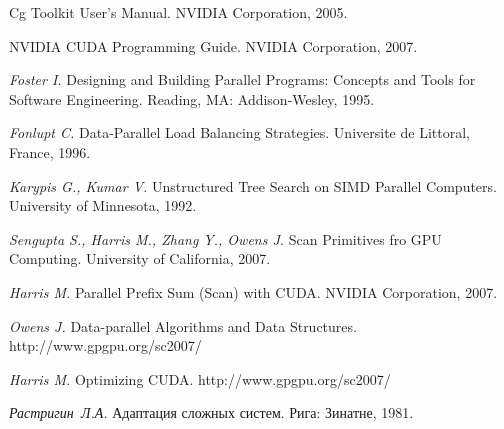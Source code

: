 \begin{thebibliography}{99}
    Cg Toolkit User's Manual.
    NVIDIA Corporation, 2005.

    NVIDIA CUDA Programming Guide.
    NVIDIA Corporation, 2007.

    \emph{Foster I.} Designing and Building Parallel Programs: Concepts and Tools for Software Engineering.
    Reading, MA: Addison-Wesley, 1995.
    
    \emph{Fonlupt C.} Data-Parallel Load Balancing Strategies.
    Universite de Littoral, France, 1996.

    \emph{Karypis G., Kumar V.} Unstructured Tree Search on SIMD Parallel Computers.
    University of Minnesota, 1992.

    \emph{Sengupta S., Harris M., Zhang Y., Owens J.} Scan Primitives fro GPU Computing.
    University of California, 2007.

    \emph{Harris M.} Parallel Prefix Sum (Scan) with CUDA.
    NVIDIA Corporation, 2007.

    \emph{Owens J.}  Data-parallel Algorithms and Data Structures.
    http://www.gpgpu.org/sc2007/

    \emph{Harris M.}  Optimizing CUDA.
    http://www.gpgpu.org/sc2007/

    \emph{Растригин Л.А.} Адаптация сложных систем. 
    Рига: Зинатне, 1981.
\end{thebibliography}